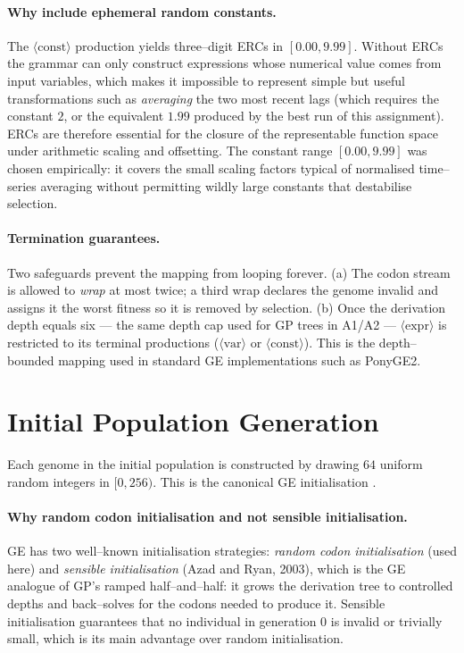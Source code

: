 \documentclass[12pt,a4paper]{article}
\begin{document}
\paragraph{Why include ephemeral random constants.}
The $\langle\text{const}\rangle$ production yields three--digit ERCs in
$[0.00,9.99]$. Without ERCs the grammar can only construct expressions
whose numerical value comes from input variables, which makes it
impossible to represent simple but useful transformations such as
\emph{averaging} the two most recent lags (which requires the constant
$2$, or the equivalent $1.99$ produced by the best run of this
assignment). ERCs are therefore essential for the closure of the
representable function space under arithmetic scaling and offsetting.
The constant range $[0.00, 9.99]$ was chosen empirically: it covers the
small scaling factors typical of normalised time--series averaging
without permitting wildly large constants that destabilise selection.

\paragraph{Termination guarantees.}
Two safeguards prevent the mapping from looping forever. (a) The codon
stream is allowed to \emph{wrap} at most twice; a third wrap declares
the genome invalid and assigns it the worst fitness so it is removed by
selection. (b) Once the derivation depth equals six --- the same depth
cap used for GP trees in A1/A2 --- $\langle\text{expr}\rangle$ is
restricted to its terminal productions ($\langle\text{var}\rangle$ or
$\langle\text{const}\rangle$). This is the depth--bounded mapping used
in standard GE implementations such as PonyGE2.

\section{Initial Population Generation}

Each genome in the initial population is constructed by drawing
$64$ uniform random integers in $[0, 256)$. This is the canonical GE
initialisation \cite{ONeillRyan2001}.

\paragraph{Why random codon initialisation and not sensible
initialisation.} GE has two well--known initialisation strategies:
\emph{random codon initialisation} (used here) and \emph{sensible
initialisation} (Azad and Ryan, 2003), which is the GE analogue of GP's
ramped half--and--half: it grows the derivation tree to controlled
depths and back--solves for the codons needed to produce it. Sensible
initialisation guarantees that no individual in generation 0 is invalid
or trivially small, which is its main advantage over random
initialisation.
\end{document}
